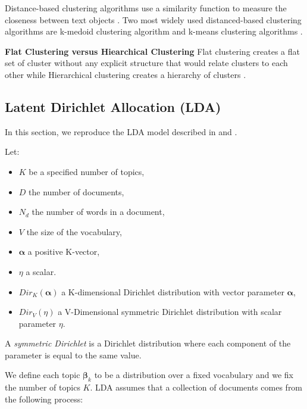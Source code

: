 \documentclass{article}
\begin{document}
Distance-based clustering algorithms use a similarity function to measure the closeness between text objects \cite{aggarwal2012mining}. Two most widely used distanced-based clustering algorithms are k-medoid clustering algorithm and k-means clustering algorithms \cite{aggarwal2012mining,manning2008iir}.

\textbf{Flat Clustering versus Hiearchical Clustering} Flat clustering creates a flat set of cluster without any explicit structure that would relate clusters to each other while Hierarchical clustering creates a hierarchy of clusters \cite{manning2008iir}.





\subsection{Latent Dirichlet Allocation (LDA)}

In this section, we reproduce the LDA model described in \cite{wang2018general} and \cite{blei2009topic}.

Let:

\begin{itemize}
  \item $K$ be a specified number of topics,
  \item $D$ the number of documents,
  \item $N_d$ the number of words in a document,
  \item $V$  the size of the vocabulary,
  \item $\boldsymbol{\alpha}$ a positive K-vector,
  \item $\eta$ a scalar. 
  \item $Dir_K(\boldsymbol{\alpha})$ a K-dimensional Dirichlet distribution with vector parameter $\boldsymbol{\alpha}$,
  \item $Dir_V(\eta)$ a V-Dimensional symmetric Dirichlet distribution with scalar parameter $\eta$.
\end{itemize}

A \textit{symmetric Dirichlet} is a Dirichlet distribution where each component of the parameter is equal to the same value.

We define each topic $\boldsymbol{\beta}_k$ to be a distribution over a fixed vocabulary and we fix the number of topics $K$. LDA assumes that a collection of documents comes from the following process:
\end{document}
